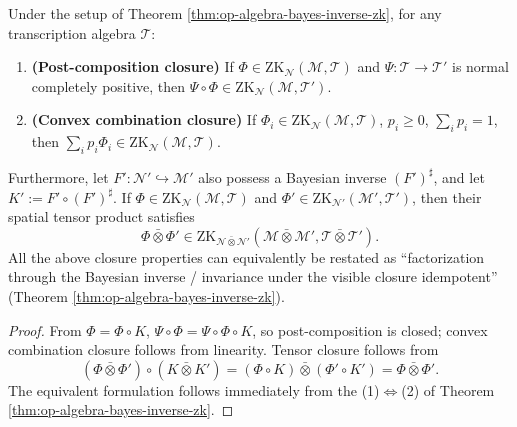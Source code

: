 \begin{corollary}\label{cor:op-algebra-zk-ideal-tensor-closure}
Under the setup of Theorem \ref{thm:op-algebra-bayes-inverse-zk}, for any transcription algebra \(\mathcal{T}\):
\begin{enumerate}
  \item \textbf{(Post-composition closure)} If \(\Phi\in \mathrm{ZK}_{\mathcal{N}}(\mathcal{M},\mathcal{T})\) and \(\Psi:\mathcal{T}\to\mathcal{T}'\) is normal completely positive, then \(\Psi\circ\Phi\in\mathrm{ZK}_{\mathcal{N}}(\mathcal{M},\mathcal{T}')\).
  \item \textbf{(Convex combination closure)} If \(\Phi_i\in\mathrm{ZK}_{\mathcal{N}}(\mathcal{M},\mathcal{T})\), \(p_i\ge 0\), \(\sum_i p_i=1\), then \(\sum_i p_i\Phi_i\in\mathrm{ZK}_{\mathcal{N}}(\mathcal{M},\mathcal{T})\).
\end{enumerate}
Furthermore, let \(F':\mathcal{N}'\hookrightarrow\mathcal{M}'\) also possess a Bayesian inverse \((F')^\sharp\), and let \(K':=F'\circ (F')^\sharp\).
If \(\Phi\in\mathrm{ZK}_{\mathcal{N}}(\mathcal{M},\mathcal{T})\) and \(\Phi'\in\mathrm{ZK}_{\mathcal{N}'}(\mathcal{M}',\mathcal{T}')\),
then their spatial tensor product satisfies
\[
\Phi\bar\otimes \Phi'\in \mathrm{ZK}_{\mathcal{N}\bar\otimes \mathcal{N}'}(\mathcal{M}\bar\otimes \mathcal{M}',\mathcal{T}\bar\otimes \mathcal{T}').
\]
All the above closure properties can equivalently be restated as ``factorization through the Bayesian inverse / invariance under the visible closure idempotent'' (Theorem \ref{thm:op-algebra-bayes-inverse-zk}).
\end{corollary}
\begin{proof}
From \(\Phi=\Phi\circ K\),
\(
\Psi\circ\Phi=\Psi\circ\Phi\circ K
\), so post-composition is closed; convex combination closure follows from linearity.
Tensor closure follows from
\[
(\Phi\bar\otimes\Phi')\circ (K\bar\otimes K')
=(\Phi\circ K)\bar\otimes(\Phi'\circ K')
=\Phi\bar\otimes\Phi'.
\]
The equivalent formulation follows immediately from the (1)$\Leftrightarrow$(2) of Theorem \ref{thm:op-algebra-bayes-inverse-zk}. \qedhere
\end{proof}


